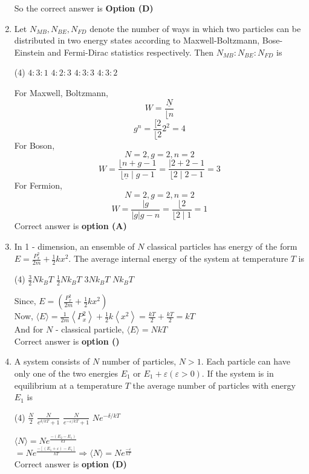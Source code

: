\begin{enumerate}
\begin{answer}
So the correct answer is \textbf{Option (D)}
\end{answer}
	\item Let $N_{M B}, N_{B E}, N_{F D}$ denote the number of ways in which two particles can be distributed in two energy states according to Maxwell-Boltzmann, Bose-Einstein and Fermi-Dirac statistics respectively. Then $N_{M B}: N_{B E}: N_{F D}$ is
\begin{tasks}(4)
\task[\textbf{A.}]  $4: 3: 1$
\task[\textbf{B.}]  $4: 2: 3$
\task[\textbf{C.}] $4: 3: 3$
\task[\textbf{D.}] $4: 3: 2$
\end{tasks}
\begin{answer}
For Maxwell, Boltzmann, $$W=\frac{\underline{N}}{\lfloor n}$$ $$g^{n}=\frac{[2}{\lfloor 2} 2^{2}=4$$
For Boson, $$N=2, g=2, n=2$$ 
$$ W=\frac{\lfloor n+g-1}{\lfloor\underline{n} \mid g-1}=\frac{\mid 2+2-1}{\lfloor 2 \mid 2-1}=3$$
For Fermion, $$N=2, g=2, n=2$$
$$ W=\frac{\mid g}{|g| g-n}=\frac{\lfloor 2}{\lfloor 2 \mid 1}=1$$
Correct answer is \textbf{option (A)}
\end{answer}
\item In 1 - dimension, an ensemble of $N$ classical particles has energy of the form $E=\frac{P_{x}^{2}}{2 m}+\frac{1}{2} k x^{2}$. The average internal energy of the system at temperature $T$ is 
\begin{tasks}(4)
\task[\textbf{A.}] $\frac{3}{2} N k_{B} T$
\task[\textbf{B.}] $\frac{1}{2} N k_{B} T$ 
\task[\textbf{C.}] $3 N k_{B} T$
\task[\textbf{D.}] $N k_{B} T$
\end{tasks}
\begin{answer}
Since, $E=\left(\frac{P_{x}^{2}}{2 m}+\frac{1}{2} k x^{2}\right)$\\
Now, $\langle E\rangle=\frac{1}{2 m}\left\langle P_{x}^{2}\right\rangle+\frac{1}{2} k\left\langle x^{2}\right\rangle=\frac{k T}{2}+\frac{k T}{2}=k T$\\
And for $N$ - classical particle, $\langle E\rangle=N k T$\\
Correct answer is \textbf{option ()}
\end{answer}	
	\item A system consists of $N$ number of particles, $N>1 .$ Each particle can have only one of the two energies $E_{1}$ or $E_{1}+\varepsilon(\varepsilon>0) .$ If the system is in equilibrium at a temperature $T$ the average number of particles with energy $E_{1}$ is
\begin{tasks}(4)
\task[\textbf{A.}] $\frac{N}{2}$
\task[\textbf{B.}] $\frac{N}{e^{\delta / k T}+1}$ 
\task[\textbf{C.}] $\frac{N}{e^{-\varepsilon / k T}+1}$
\task[\textbf{D.}] $N e^{-\delta / k T}$
\end{tasks}
\begin{answer}
$\langle N\rangle=N e^{\frac{-\left(E_{2}-E_{1}\right)}{k T}}$\\
$=N e^{\frac{-\left[\left(E_{1}+\varepsilon\right)-E_{1}\right]}{k T}} \Rightarrow\langle N\rangle=N e^{\frac{-\varepsilon}{k T}}$\\
Correct answer is \textbf{option (D)}
\end{answer}
	




	
\end{enumerate}